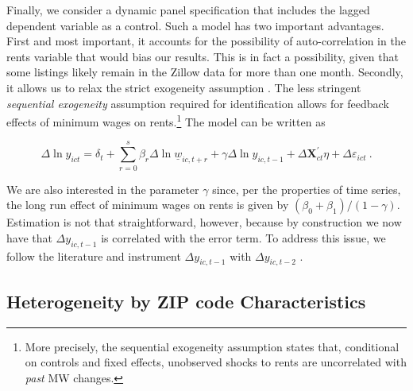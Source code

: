 
Finally, we consider a dynamic panel specification that includes the lagged dependent variable 
as a control. Such a model has two important advantages. First and most important, it accounts 
for the possibility of auto-correlation in the rents variable that would bias our results. This 
is in fact a possibility, given that some listings likely remain in the Zillow data for more 
than one month. Secondly, it allows us to relax the strict exogeneity assumption 
\parencite{ArellanoHonore2001}. The less stringent \textit{sequential exogeneity} assumption 
required for identification allows for feedback effects of minimum wages on rents.\footnote{More 
	precisely, the sequential exogeneity assumption states that, conditional on controls and 
	fixed 	effects, unobserved shocks to rents are uncorrelated with \textit{past} MW changes.}
The model can be written as

\begin{equation}\label{eq:ab_panel}
	\Delta \ln y_{ict} = \delta_t
						+ \sum_{r=0}^{s} \beta_r \Delta \ln \underline{w}_{ic,t+r}
						+ \gamma \Delta \ln y_{ic,t-1} + \Delta \mathbf{X}^{'}_{ct}\eta
						+ \Delta \varepsilon_{ict} \ .
\end{equation}

We are also interested in the parameter $\gamma$ since, per the properties of time series, the 
long run effect of minimum wages on rents is given by $(\beta_0 + \beta_1)/(1-\gamma)$. 
Estimation is not that straightforward, however, because by construction we now have that 
$\Delta y_{ic,t-1}$ is correlated with the error term. To address this issue, we follow 
the literature and instrument $\Delta y_{ic,t-1}$ with $\Delta y_{ic,t-2}$ 
\parencite{ArellanoHonore2001}.

\subsection{Heterogeneity by ZIP code Characteristics}\label{sec:strategy_heterogeneity}

